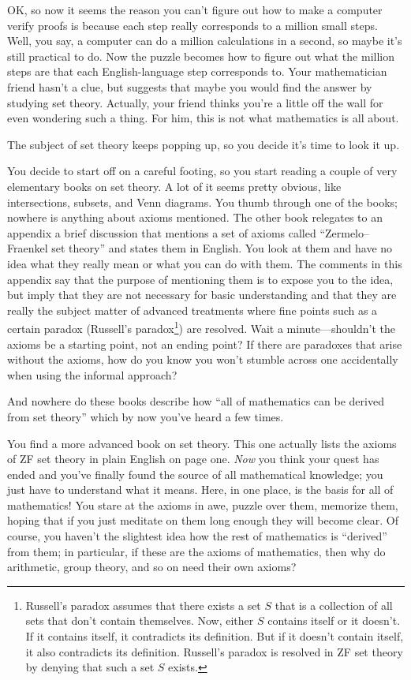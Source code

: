 OK, so now it seems the reason you can't figure out how to make a
computer verify proofs is because each step really corresponds to a
million small steps.  Well, you say, a computer can do a million
calculations in a second, so maybe it's still practical to do.  Now the
puzzle becomes how to figure out what the million steps are that each
English-language step corresponds to.  Your mathematician friend hasn't
a clue, but suggests that maybe you would find the answer by studying
set theory.  Actually, your friend thinks you're a little off the wall
for even wondering such a thing.  For him, this is not what mathematics
is all about.

The subject of set theory keeps popping up, so you decide it's
time to look it up.

You decide to start off on a careful footing, so you start reading a couple of
very elementary books on set theory.  A lot of it seems pretty obvious, like
intersections, subsets, and Venn diagrams.  You thumb through one of the
books; nowhere is anything about axioms mentioned. The other book relegates to
an appendix a brief discussion that mentions a set of axioms called
``Zermelo--Fraenkel set theory'' and states
them in English.  You look at them and have no idea what they really mean or
what you can do with them.  The comments in this appendix say that the purpose
of mentioning them is to expose you to the idea, but imply that they are not
necessary for basic understanding and that they are really the subject matter
of advanced treatments where fine points such as a certain paradox (Russell's
paradox\footnote{Russell's paradox assumes that there
exists a set $S$ that is a collection of all sets that don't contain
themselves.  Now, either $S$ contains itself or it doesn't.  If it contains
itself, it contradicts its definition.  But if it doesn't contain itself, it
also contradicts its definition.  Russell's paradox is resolved in ZF set
theory by denying that such a set $S$ exists.}) are resolved.  Wait a
minute---shouldn't the axioms be a starting point, not an ending point?  If
there are paradoxes that arise without the axioms, how do you know you won't
stumble across one accidentally when using the informal approach?

And nowhere do these books describe how ``all of mathematics can be
derived from set theory'' which by now you've heard a few times.

You find a more advanced book on set theory.  This one actually lists the
axioms of ZF set theory in plain English on page one.  {\em Now} you think
your quest has ended and you've finally found the source of all mathematical
knowledge; you just have to understand what it means.  Here, in one place, is
the basis for all of mathematics!  You stare at the axioms in awe, puzzle over
them, memorize them, hoping that if you just meditate on them long enough they
will become clear.  Of course, you haven't the slightest idea how the rest of
mathematics is ``derived'' from them; in particular, if these are the axioms
of mathematics, then why do arithmetic, group theory, and so on need their own
axioms?

